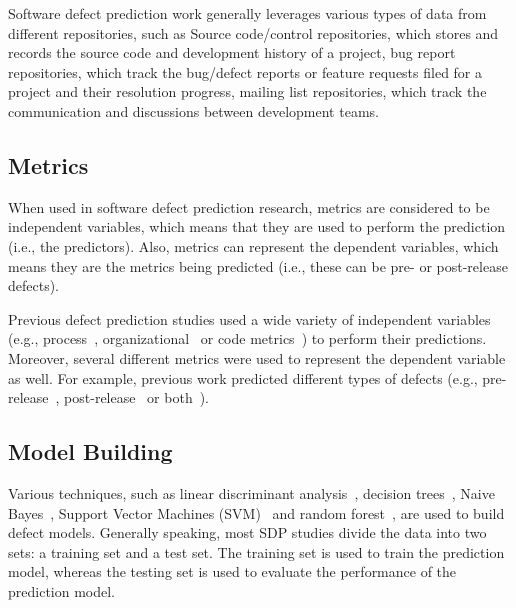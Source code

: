Software defect prediction work generally leverages various types of data from different repositories, such as 
Source code/control repositories, which stores and records the source code and development history of a project, bug report repositories, which track the bug/defect reports or feature requests filed for a project and their resolution progress, mailing list repositories, which track the communication and discussions between development teams.

\subsection{Metrics}

When used in software defect prediction research, metrics are considered to be independent variables, which means that they are used to perform the prediction (i.e., the predictors).
Also, metrics can represent the dependent variables, which means they are the metrics being predicted (i.e., these can be pre- or post-release defects).

Previous defect prediction studies used a wide variety of independent variables (e.g., process~\cite{Hassan2009ICSE}, organizational~\cite{Nagappan2008ICSE,Cataldo2009TSE} or code metrics~\cite{Zimmermann2007PROMISE,Nagappan2007ESEM,Subramanyam2003TSE,Koru2005Software,Menzies2007TSE}) to perform their predictions. Moreover, several different metrics were used to represent the dependent variable as well. For example, previous work predicted different types of defects (e.g., pre-release~\cite{NagappanICSE05_2}, post-release~\cite{Zimmermann2007PROMISE,Zheng2006TSE} or both~\cite{Shin2009MSR,Shihab2011FSE}).

\subsection{Model Building}

Various techniques, such as linear discriminant analysis~\cite{Ohlsson1996TSE, Pighin1997}, decision trees~\cite{Koru2005PROMISE}, Naive Bayes~\cite{Menzies2008PROMISE}, Support Vector Machines (SVM)~\cite{Elish2008JSS,Kim2008TSE} and random forest~\cite{Guo2004ISSRE}, are used to build defect models.
Generally speaking, most SDP studies divide the data into two sets: a training set and a test set. The training set is used to train the prediction model, whereas the testing set is used to evaluate the performance of the prediction model. 

